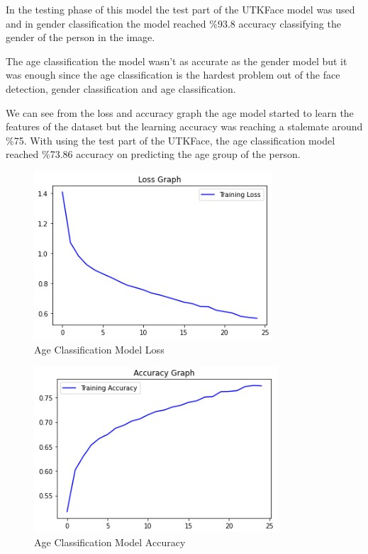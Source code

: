 \documentclass[conference]{IEEEtran}
\begin{document}
\bigskip
In the testing phase of this model the test part of the UTKFace model was used and in gender classification the model reached \%93.8 accuracy classifying the gender of the person in the image.

The age classification the model wasn't as accurate as the gender model but it was enough since the age classification is the hardest problem out of the face detection, gender classification and age classification. 

We can see from the loss and accuracy graph the age model started to learn the features of the dataset but the learning accuracy was reaching a stalemate around \%75. With using the test part of the UTKFace, the age classification model reached \%73.86 accuracy on predicting the age group of the person.

\begin{figure}
\centering
\includegraphics[scale=0.75]{age_loss.jpg}
\caption{Age Classification Model Loss}
\label{fig:ageloss}
\end{figure}

\begin{figure}
\centering
\includegraphics[scale=0.75]{age_accuracy.jpg}
\caption{Age Classification Model Accuracy}
\label{fig:ageaccuracy}
\end{figure}
\end{document}
